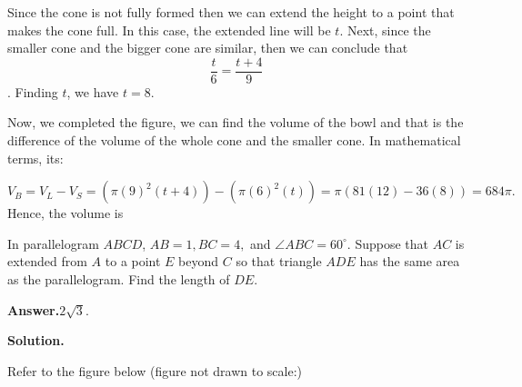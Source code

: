\documentclass[12pt,paper=letter]{scrartcl}
\newcommand{\ans}[1]{{\sffamily \bfseries Answer.}\;\(\boxed{\text{#1}}\).}
\newcommand{\sol}{{\sffamily \bfseries Solution.}\;}
\begin{document}
Since the cone is not fully formed then we can extend the height to a point that makes the cone full. In this case, the extended line will be $t$. Next, since the smaller cone and the bigger cone are similar, then we can conclude that $$\dfrac{t}{6} = \dfrac{t+4}{9}$$. Finding $t$, we have $t=8.$

\newpage

Now, we completed the figure, we can find the volume of the bowl and that is the difference of the volume of the whole cone and the smaller cone. In mathematical terms, its:

$$V_{B} = V_L - V_S = \left(\pi(9)^2(t+4) \right) - \left(\pi(6)^2(t) \right) = \pi \left(81(12)  - 36(8)\right) = 684\pi.$$ Hence, the volume is 

\begin{probboxed} 

In parallelogram $ABCD$, $AB=1, BC =4,$ and $\angle ABC = 60^{\circ}$. Suppose that $AC$ is extended from $A$ to a point $E$ beyond $C$ so that triangle $ADE$ has the same area as the parallelogram. Find the length of $DE.$

\end{probboxed}

\ans{$2\sqrt{3}$}

\sol

Refer to the figure below (figure not drawn to scale:)
\end{document}
